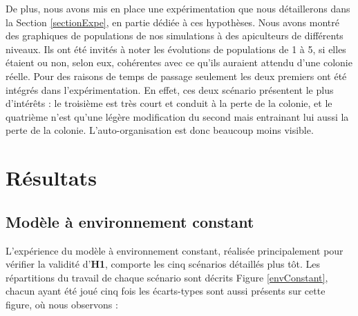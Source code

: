 			De plus, nous avons mis en place une expérimentation que nous détaillerons dans la Section \ref{sectionExpe}, en partie dédiée à ces hypothèses. Nous avons montré des graphiques de populations de nos simulations à des apiculteurs de différents niveaux. Ils ont été invités à noter les évolutions de populations de 1 à 5, si elles étaient ou non, selon eux, cohérentes avec ce qu'ils auraient attendu d'une colonie réelle. Pour des raisons de temps de passage seulement les deux premiers ont été intégrés dans l'expérimentation. En effet, ces deux scénario présentent le plus d'intérêts : le troisième est très court et conduit à la perte de la colonie, et le quatrième n'est qu'une légère modification du second mais entrainant lui aussi la perte de la colonie. L'auto-organisation est donc beaucoup moins visible.
				
			
	\section{Résultats}
	
	\subsection{Modèle à environnement constant}
	
	L'expérience du modèle à environnement constant, réalisée principalement pour vérifier la validité d'\textbf{H1}, comporte les cinq scénarios détaillés plus tôt. Les répartitions du travail de chaque scénario sont décrits Figure \ref{envConstant}, chacun ayant été joué cinq fois les écarts-types sont aussi présents sur cette figure, où nous observons :
	
